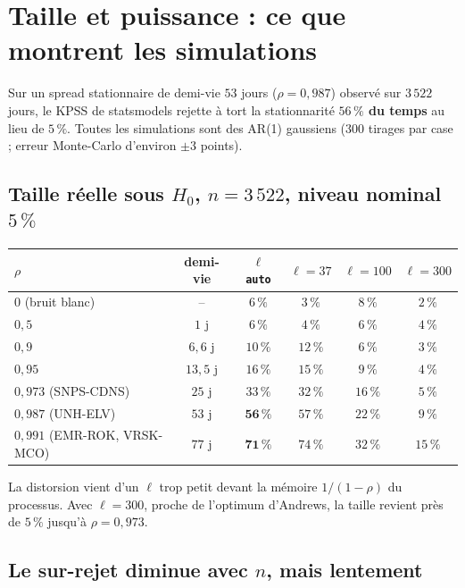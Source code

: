 \documentclass[11pt,a4paper]{article}
\newcommand{\code}[1]{\texttt{#1}}
\theoremstyle{definition}
\begin{document}
\section{Taille et puissance : ce que montrent les simulations}\label{sec:simu}

Sur un spread stationnaire de demi-vie $53$ jours ($\rho = 0{,}987$) observé sur $3\,522$ jours, le KPSS de statsmodels rejette à tort la stationnarité \textbf{$56\,\%$ du temps} au lieu de $5\,\%$. Toutes les simulations sont des AR(1) gaussiens ($300$ tirages par case ; erreur Monte-Carlo d'environ $\pm 3$ points).

\subsection{Taille réelle sous \texorpdfstring{$H_0$}{H0}, \texorpdfstring{$n = 3\,522$}{n = 3522}, niveau nominal \texorpdfstring{$5\,\%$}{5\%}}

\begin{center}
\begin{tabular}{@{}lccccc@{}}
\toprule
$\rho$ & demi-vie & $\ell$ \code{auto} & $\ell = 37$ & $\ell = 100$ & $\ell = 300$ \\
\midrule
$0$ (bruit blanc) & -- & $6\,\%$ & $3\,\%$ & $8\,\%$ & $2\,\%$ \\
$0{,}5$ & $1$ j & $6\,\%$ & $4\,\%$ & $6\,\%$ & $4\,\%$ \\
$0{,}9$ & $6{,}6$ j & $10\,\%$ & $12\,\%$ & $6\,\%$ & $3\,\%$ \\
$0{,}95$ & $13{,}5$ j & $16\,\%$ & $15\,\%$ & $9\,\%$ & $4\,\%$ \\
$0{,}973$ (SNPS-CDNS) & $25$ j & $33\,\%$ & $32\,\%$ & $16\,\%$ & $5\,\%$ \\
$0{,}987$ (UNH-ELV) & $53$ j & $\mathbf{56\,\%}$ & $57\,\%$ & $22\,\%$ & $9\,\%$ \\
$0{,}991$ (EMR-ROK, VRSK-MCO) & $77$ j & $\mathbf{71\,\%}$ & $74\,\%$ & $32\,\%$ & $15\,\%$ \\
\bottomrule
\end{tabular}
\end{center}

La distorsion vient d'un $\ell$ trop petit devant la mémoire $1/(1-\rho)$ du processus. Avec $\ell = 300$, proche de l'optimum d'Andrews, la taille revient près de $5\,\%$ jusqu'à $\rho = 0{,}973$.

\subsection{Le sur-rejet diminue avec \texorpdfstring{$n$}{n}, mais lentement}
\end{document}
